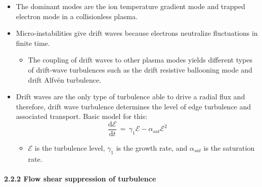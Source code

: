 \documentclass[]{article}
\providecommand{\tightlist}{%
  \setlength{\itemsep}{0pt}\setlength{\parskip}{0pt}}
\let\oldparagraph\paragraph
\renewcommand{\paragraph}[1]{\oldparagraph{#1}\mbox{}}
\begin{document}
\begin{itemize}
\item
  The dominant modes are the ion temperature gradient mode and trapped
  electron mode in a collisionless plasma.
\item
  Micro-instabilities give drift waves because electrons neutralize
  fluctuations in finite time.

  \begin{itemize}
  \tightlist
  \item
    The coupling of drift waves to other plasma modes yields different
    types of drift-wave turbulences such as the drift resistive
    ballooning mode and drift Alfvén turbulence.
  \end{itemize}
\item
  Drift waves are the only type of turbulence able to drive a radial
  flux and therefore, drift wave turbulence determines the level of edge
  turbulence and associated transport. Basic model for this:
  \[\frac{\text{d}\mathcal{E}}{\text{d}t} \,=\, \gamma_1 \mathcal{E} - \alpha_{sat}\mathcal{E}^2\]

  \begin{itemize}
  \tightlist
  \item
    \(\mathcal{E}\) is the turbulence level, \(\gamma_1\) is the growth
    rate, and \(\alpha_{sat}\) is the saturation rate.
  \end{itemize}
\end{itemize}

\paragraph{2.2.2 Flow shear suppression of
turbulence}\label{flow-shear-suppression-of-turbulence}
\end{document}
